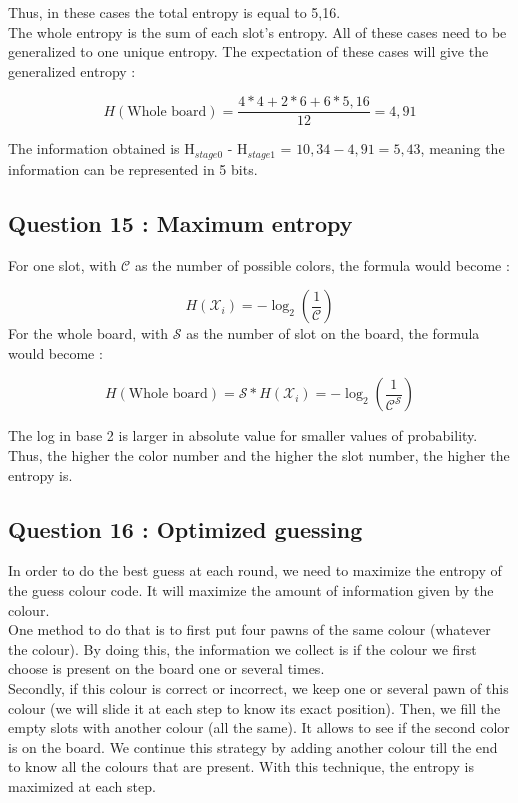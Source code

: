 \documentclass[titlepage]{article}
\begin{document}
Thus, in these cases the total entropy is equal to 5,16. \\

The whole entropy is the sum of each slot's entropy. All of these cases need to be generalized to one unique entropy. The expectation of these cases will give the generalized entropy :

$$H(\text{Whole board}) = \frac{4*4 + 2*6 + 6*5,16}{12} = 4,91$$

The information obtained is H$_{stage0}$ - H$_{stage1}$ = $10,34 - 4,91 = 5,43$, meaning the information can be represented in 5 bits.

\subsection*{Question 15 : Maximum entropy}

For one slot, with $\mathcal{C}$ as the number of possible colors, the formula would become : 

$$ H(\mathcal{X}_i) = -\log_2 \left(\frac{1}{\mathcal{C}}\right)$$
For the whole board, with $\mathcal{S}$ as the number of slot on the board, the formula would become : 

$$ H(\text{Whole board}) = \mathcal{S}*H(\mathcal{X}_i) = -\log_2 \left(\frac{1}{\mathcal{C}^{\mathcal{S}}}\right)$$

The log in base 2 is larger in absolute value for smaller values of probability. Thus, the higher the color number and the higher the slot number, the higher the entropy is. 

\subsection*{Question 16 : Optimized guessing }

In order to do the best guess at each round, we need to maximize the entropy of the guess colour code. It will maximize the amount of information given by the colour. \\

One method to do that is to first put four pawns of the same colour (whatever the colour). By doing this, the information we collect is if the colour we first choose is present on the board one or several times. \\

Secondly, if this colour is correct or incorrect, we keep one or several pawn of this colour (we will slide it at each step to know its exact position). Then, we fill the empty slots with another colour (all the same). It allows to see if the second color is on the board. We continue this strategy by adding another colour till the end to know all the colours that are present. With this technique, the entropy is maximized at each step. 
\newpage 
\end{document}
